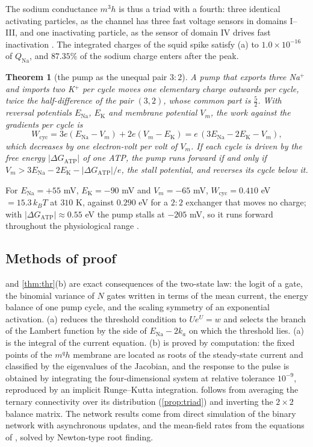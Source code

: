 \documentclass[11pt]{article}
\newtheorem{theorem}{Theorem}
\theoremstyle{definition}\newtheorem{definition}[theorem]{Definition}
\theoremstyle{remark}\newtheorem{remark}[theorem]{Remark}
\begin{document}
The sodium conductance $m^3h$ is thus a triad with a fourth: three identical activating particles, as the channel has three fast voltage sensors in domains I--III, and one inactivating particle, as the sensor of domain IV drives fast inactivation \cite{ChandaBezanilla,Capes}. The integrated charges of the squid spike satisfy (a) to $1.0\times10^{-16}$ of $Q_{\mathrm{Na}}$, and $87.35\%$ of the sodium charge enters after the peak.

\begin{theorem}[the pump as the unequal pair $3{:}2$]\label{thm:pump}
A pump that exports three Na$^+$ and imports two K$^+$ per cycle moves one elementary charge outwards per cycle, twice the half-difference of the pair $(3,2)$, whose common part is $\frac52$. With reversal potentials $E_\mathrm{Na}$, $E_\mathrm K$ and membrane potential $V_m$, the work against the gradients per cycle is
\[
W_{\mathrm{cyc}}=3e(E_\mathrm{Na}-V_m)+2e(V_m-E_\mathrm K)=e\,(3E_\mathrm{Na}-2E_\mathrm K-V_m),
\]
which decreases by one electron-volt per volt of $V_m$. If each cycle is driven by the free energy $|\Delta G_\mathrm{ATP}|$ of one ATP, the pump runs forward if and only if $V_m>3E_\mathrm{Na}-2E_\mathrm K-|\Delta G_\mathrm{ATP}|/e$, the stall potential, and reverses its cycle below it.
\end{theorem}

For $E_\mathrm{Na}=+55$ mV, $E_\mathrm K=-90$ mV and $V_m=-65$ mV, $W_{\mathrm{cyc}}=0.410$ eV $=15.3\,k_BT$ at $310$ K, against $0.290$ eV for a $2{:}2$ exchanger that moves no charge; with $|\Delta G_\mathrm{ATP}|\approx0.55$ eV the pump stalls at $-205$ mV, so it runs forward throughout the physiological range \cite{Nguyen,MiloPhillips}.

\subsection{Methods of proof}
 and \cref{thm:thr}(b) are exact consequences of the two-state law: the logit of a gate, the binomial variance of $N$ gates written in terms of the mean current, the energy balance of one pump cycle, and the scaling symmetry of an exponential activation. (a) reduces the threshold condition to $Ue^U=w$ and selects the branch of the Lambert function by the side of $E_{\mathrm{Na}}-2k_a$ on which the threshold lies. (a) is the integral of the current equation. (b) is proved by computation: the fixed points of the $m^qh$ membrane are located as roots of the steady-state current and classified by the eigenvalues of the Jacobian, and the response to the pulse is obtained by integrating the four-dimensional system at relative tolerance $10^{-9}$, reproduced by an implicit Runge--Kutta integration.  follows from averaging the ternary connectivity over its distribution (\cref{prop:triad}) and inverting the $2\times2$ balance matrix. The network results come from direct simulation of the binary network with asynchronous updates, and the mean-field rates from the equations of \cite{vVS98}, solved by Newton-type root finding.
\end{document}
